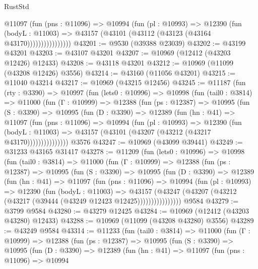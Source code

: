 \begin{lexlean}{RustStd}
\begin{coremodule}
                    @11097
                      (fun (pns : @11096) =>
                      @10994
                        (fun (pl : @10993) =>
                        @12390
                          (fun (bodyL : @11003) =>
                          @43157 (@43101 (@43112 (@43123 (@43164 @43170))))))))))))))))
@43201 := @9530 (@39388 @23039)
@43202 := @43199 @43201
@43203 := @43107 @43201
@43207 := @10969 (@12412 (@43203 @12426) @12433)
@43208 := @43118 @43201
@43212 := @10969 (@11099 (@43208 @12426) @3556)
@43214 := @43160 (@11056 @43201)
@43215 := @11040 @43214
@43217 := @10969 (@43215 @12456)
@43245 := @11187
    (fun (rty : @3390) =>
    @10997
      (fun (lets0 : @10996) =>
      @10998
        (fun (tail0 : @3814) =>
        @11000
          (fun (Γ : @10999) =>
          @12388
            (fun (ps : @12387) =>
            @10995
              (fun (S : @3390) =>
              @10995
                (fun (D : @3390) =>
                @12389
                  (fun (hn : @41) =>
                  @11097
                    (fun (pns : @11096) =>
                    @10994
                      (fun (pl : @10993) =>
                      @12390
                        (fun (bodyL : @11003) =>
                        @43157 (@43101 (@43207 (@43212 (@43217 @43170)))))))))))))))
    @3576
@43247 := @10969 (@43099 @39441)
@43249 := @31233 @43165 @31417
@43278 := @11209
    (fun (lets0 : @10996) =>
    @10998
      (fun (tail0 : @3814) =>
      @11000
        (fun (Γ : @10999) =>
        @12388
          (fun (ps : @12387) =>
          @10995
            (fun (S : @3390) =>
            @10995
              (fun (D : @3390) =>
              @12389
                (fun (hn : @41) =>
                @11097
                  (fun (pns : @11096) =>
                  @10994
                    (fun (pl : @10993) =>
                    @12390
                      (fun (bodyL : @11003) =>
                      @43157
                        (@43247
                          (@43207 (@43212 (@43217 (@39444 (@43249 @12423 @12425))))))))))))))))
    @9584
@43279 := @3799 @9584
@43280 := @43279 @12425
@43284 := @10969 (@12412 (@43203 @43280) @12433)
@43288 := @10969 (@11099 (@43208 @43280) @3556)
@43289 := @43249 @9584
@43314 := @11233
    (fun (tail0 : @3814) =>
    @11000
      (fun (Γ : @10999) =>
      @12388
        (fun (ps : @12387) =>
        @10995
          (fun (S : @3390) =>
          @10995
            (fun (D : @3390) =>
            @12389
              (fun (hn : @41) =>
              @11097
                (fun (pns : @11096) =>
                @10994

\end{coremodule}
\end{lexlean}
